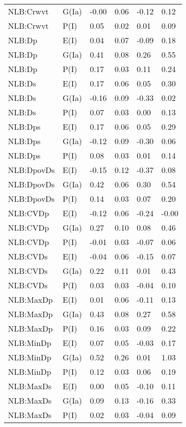 \begin{center}
\begin{longtable}{|p{1.1in}|p{0.7in}|p{0.7in}|p{0.6in}|p{0.6in}|p{0.6in}|}
  NLB:Crwvt & G(Ia) & -0.00 & 0.06 & -0.12 & 0.12 \\ 
  NLB:Crwvt & P(I) & 0.05 & 0.02 & 0.01 & 0.09 \\ 
  NLB:Dp & E(I) & 0.04 & 0.07 & -0.09 & 0.18 \\ 
  NLB:Dp & G(Ia) & 0.41 & 0.08 & 0.26 & 0.55 \\ 
  NLB:Dp & P(I) & 0.17 & 0.03 & 0.11 & 0.24 \\ 
  NLB:Ds & E(I) & 0.17 & 0.06 & 0.05 & 0.30 \\ 
  NLB:Ds & G(Ia) & -0.16 & 0.09 & -0.33 & 0.02 \\ 
  NLB:Ds & P(I) & 0.07 & 0.03 & 0.00 & 0.13 \\ 
  NLB:Dps & E(I) & 0.17 & 0.06 & 0.05 & 0.29 \\ 
  NLB:Dps & G(Ia) & -0.12 & 0.09 & -0.30 & 0.06 \\ 
  NLB:Dps & P(I) & 0.08 & 0.03 & 0.01 & 0.14 \\ 
  NLB:DpovDs & E(I) & -0.15 & 0.12 & -0.37 & 0.08 \\ 
  NLB:DpovDs & G(Ia) & 0.42 & 0.06 & 0.30 & 0.54 \\ 
  NLB:DpovDs & P(I) & 0.14 & 0.03 & 0.07 & 0.20 \\ 
  NLB:CVDp & E(I) & -0.12 & 0.06 & -0.24 & -0.00 \\ 
  NLB:CVDp & G(Ia) & 0.27 & 0.10 & 0.08 & 0.46 \\ 
  NLB:CVDp & P(I) & -0.01 & 0.03 & -0.07 & 0.06 \\ 
  NLB:CVDs & E(I) & -0.04 & 0.06 & -0.15 & 0.07 \\ 
  NLB:CVDs & G(Ia) & 0.22 & 0.11 & 0.01 & 0.43 \\ 
  NLB:CVDs & P(I) & 0.03 & 0.03 & -0.04 & 0.10 \\ 
  NLB:MaxDp & E(I) & 0.01 & 0.06 & -0.11 & 0.13 \\ 
  NLB:MaxDp & G(Ia) & 0.43 & 0.08 & 0.27 & 0.58 \\ 
  NLB:MaxDp & P(I) & 0.16 & 0.03 & 0.09 & 0.22 \\ 
  NLB:MinDp & E(I) & 0.07 & 0.05 & -0.03 & 0.17 \\ 
  NLB:MinDp & G(Ia) & 0.52 & 0.26 & 0.01 & 1.03 \\ 
  NLB:MinDp & P(I) & 0.12 & 0.03 & 0.06 & 0.19 \\ 
  NLB:MaxDs & E(I) & 0.00 & 0.05 & -0.10 & 0.11 \\ 
  NLB:MaxDs & G(Ia) & 0.09 & 0.13 & -0.16 & 0.33 \\ 
  NLB:MaxDs & P(I) & 0.02 & 0.03 & -0.04 & 0.09 \\ 

\end{longtable}
\end{center}
